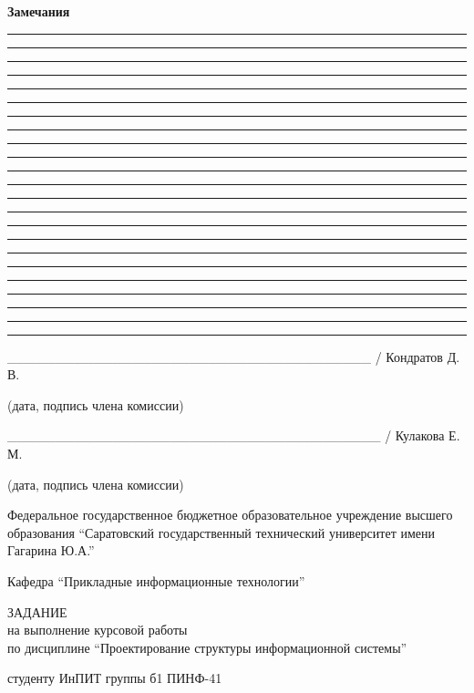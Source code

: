 \documentclass[14pt,russian]{extarticle}
\begin{document}

%
%

\begin{center}
	\textbf{Замечания}

	\rule{\textwidth}{0.15mm}
	\rule{\textwidth}{0.15mm}
	\rule{\textwidth}{0.15mm}
	\rule{\textwidth}{0.15mm}
	\rule{\textwidth}{0.15mm}
	\rule{\textwidth}{0.15mm}
	\rule{\textwidth}{0.15mm}
	\rule{\textwidth}{0.15mm}
	\rule{\textwidth}{0.15mm}
	\rule{\textwidth}{0.15mm}
	\rule{\textwidth}{0.15mm}
	\rule{\textwidth}{0.15mm}
	\rule{\textwidth}{0.15mm}
	\rule{\textwidth}{0.15mm}
	\rule{\textwidth}{0.15mm}
	\rule{\textwidth}{0.15mm}
	\rule{\textwidth}{0.15mm}
	\rule{\textwidth}{0.15mm}
	\rule{\textwidth}{0.15mm}
	\rule{\textwidth}{0.15mm}
	\rule{\textwidth}{0.15mm}
	\rule{\textwidth}{0.15mm}
	\rule{\textwidth}{0.15mm}
\end{center}

\bigskip

\begin{flushright}
\_\_\_\_\_\_\_\_\_\_\_\_\_\_\_\_\_\_\_\_\_\_\_\_\_\_\_\_\_\_\_\_\_\_\_\_\_\_ / Кондратов Д. В.

(дата, подпись члена комиссии)

\bigskip

\_\_\_\_\_\_\_\_\_\_\_\_\_\_\_\_\_\_\_\_\_\_\_\_\_\_\_\_\_\_\_\_\_\_\_\_\_\_\_ / Кулакова Е. М.

(дата, подпись члена комиссии)
\end{flushright}

%
%

\clearpage
\begin{center}
	\singlespacing

	Федеральное государственное бюджетное образовательное учреждение высшего
	образования \enquote{Саратовский государственный технический университет имени
	Гагарина Ю.А.}

	\bigskip
	\bigskip

	Кафедра \enquote{Прикладные информационные технологии}

	\bigskip
	\bigskip
	\bigskip
	\bigskip

	\singlespacing

	ЗАДАНИЕ \\
	на выполнение курсовой работы \\
	по дисциплине \enquote{Проектирование структуры информационной системы}

	\bigskip

	студенту ИнПИТ группы б1 ПИНФ-41
\end{center}
\end{document}
